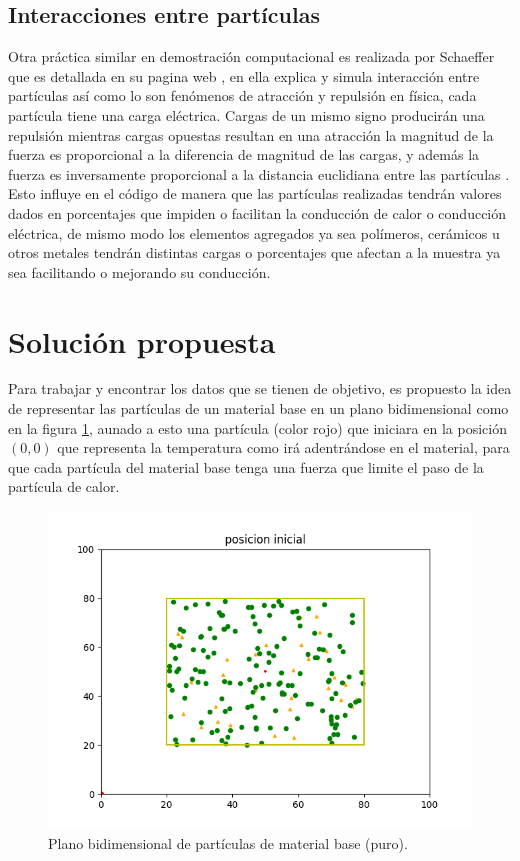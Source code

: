 \documentclass[3pt,twocolumn]{elsarticle}
\begin{document}
\subsection{Interacciones entre partículas}
Otra práctica similar en demostración computacional es realizada por Schaeffer \cite{IP} que es detallada en su pagina web \cite{dra}, en ella explica y simula interacción entre partículas así como lo son fenómenos de atracción y repulsión en física, cada partícula tiene una carga eléctrica. Cargas de un mismo signo producirán una repulsión mientras cargas opuestas resultan en una atracción la magnitud de la fuerza es proporcional a la diferencia de magnitud de las cargas, y además la fuerza es inversamente proporcional a la distancia euclidiana entre las partículas \cite{IP}. Esto influye en el código de manera que las partículas realizadas tendrán valores dados en porcentajes que impiden o facilitan la conducción de calor o conducción eléctrica, de mismo modo los elementos agregados ya sea polímeros, cerámicos u otros metales tendrán distintas cargas o porcentajes que afectan a la muestra ya sea facilitando o mejorando su conducción.

\section{Solución propuesta }\label{intr}
Para trabajar y encontrar los datos que se tienen de objetivo, es propuesto la idea de representar las partículas de un material base en un plano bidimensional como en la figura \ref{f2}, aunado a esto una partícula (color rojo) que iniciara en la posición \texttt{$(0,0)$} que representa la temperatura como irá adentrándose en el material, para que cada partícula del material base tenga una fuerza que limite el paso de la partícula de calor.

\begin{figure}[H]
  \centering      
  \includegraphics[scale=.5]{p_inicial.png}
  \caption{Plano bidimensional de partículas de material base (puro).}
  \label{f2}
\end{figure}
\bigskip
\end{document}

